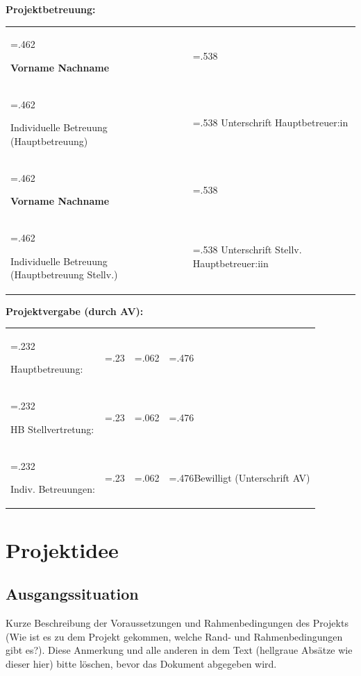 \documentclass[
	headings=optiontotocandhead,%
	oneside,
	numbers=noenddot,%
	toc=flat, %
	10pt, %
	parskip=full, %
	listof=totoc, %
	listof=flat, %
	numbers=noenddot, %
	bibliography=totoc, %
	a4paper,DIV=14,
]{scrartcl}
\begin{document}
\large{\textbf{Projektbetreuung:}}
\begin{table}[h]
\begin{tabularx} {\textwidth} {
	|>{\hsize=.462\hsize}X
	|>{\hsize=.538\hsize}X|
}

\hline
\rule{0pt}{28pt}	\large{\textbf{Vorname Nachname}}	&              \\
\rule{0pt}{11pt}\textcolor[HTML]{A6A6A6}{\footnotesize{Individuelle Betreuung (Hauptbetreuung)}}	&	\textcolor[HTML]{A6A6A6}{\footnotesize{Unterschrift Hauptbetreuer:in}}	\\ \hline
\rule{0pt}{28pt}	\large{\textbf{Vorname Nachname}}	&              \\
\rule{0pt}{11pt}\textcolor[HTML]{A6A6A6}{\footnotesize{Individuelle Betreuung (Hauptbetreuung Stellv.)}}	&	\textcolor[HTML]{A6A6A6}{\footnotesize{Unterschrift Stellv. Hauptbetreuer:iin}}	\\ \hline
\end{tabularx}
\end{table}


\large{\textbf{\textcolor[HTML]{A6A6A6}{Projektvergabe (durch AV):}}}

\begin{table}[h]
\begin{tabularx} {\textwidth} {
	|>{\hsize=.232\hsize}X
	|>{\hsize=.23\hsize}X
	|>{\hsize=.062\hsize}X
	|>{\hsize=.476\hsize}X|
}

\cline{1-2} \cline{4-4}
\rule{0pt}{17pt}\normalsize{\textcolor[HTML]{808080}{Hauptbetreuung:}}&&&\\ \cline{1-2}
\rule{0pt}{17pt}\normalsize{\textcolor[HTML]{808080}{HB Stellvertretung:}}&&&\\ \cline{1-2}
\rule{0pt}{17pt}\normalsize{\textcolor[HTML]{808080}{Indiv. Betreuungen:}}&&&\footnotesize{\textcolor[HTML]{808080}{Bewilligt (Unterschrift AV)}}\\ \cline{1-2} \cline{4-4}
\end{tabularx}
\end{table}

\newpage

\tableofcontents
\newpage

\section{Projektidee}

\subsection{Ausgangssituation}
Kurze Beschreibung der Voraussetzungen und Rahmenbedingungen des Projekts (Wie ist es zu dem Projekt gekommen, welche Rand- und Rahmenbedingungen gibt es?). Diese Anmerkung und alle anderen in dem Text (hellgraue Absätze wie dieser hier) bitte löschen, bevor das Dokument abgegeben wird. 
\end{document}
